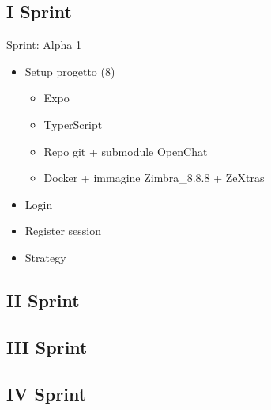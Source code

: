 \subsection{I Sprint}
Sprint: Alpha 1
\begin{itemize}
	\item Setup progetto (8)
	\begin{itemize}
		\item Expo
		\item TyperScript	
		\item Repo git + submodule OpenChat
		\item Docker + immagine Zimbra\_8.8.8 + ZeXtras
	\end{itemize}
	\item Login
	\item Register session
	\item Strategy
\end{itemize}

\subsection{II Sprint}
\subsection{III Sprint}
\subsection{IV Sprint}
